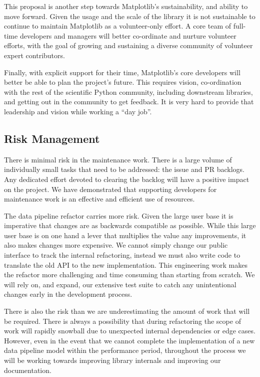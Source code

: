 \documentclass[12pt]{article}
\numberwithin{page}{section}
\begin{document}
This proposal is another step towards Matplotlib's sustainability, and
ability to move forward. Given the usage and the scale of the library
it is not sustainable to continue to maintain Matplotlib as a
volunteer-only effort.  A core team of full-time developers and
managers will better co-ordinate and nurture volunteer efforts, with
the goal of growing and sustaining a diverse community of volunteer
expert contributors.

Finally, with explicit support for their time, Matplotlib's core developers
will better be able to plan the project's future.
This requires vision, co-ordination with the rest of the scientific
Python community, including downstream libraries, and getting out in
the community to get feedback.  It is very hard to provide that
leadership and vision while working a ``day job''.


\subsection{Risk Management}

There is minimal risk in the maintenance work.  There is a large volume
of individually small tasks that need to be addressed: the issue and
PR backlogs.  Any dedicated effort devoted to clearing the backlog
will have a positive impact on the project.  We have demonstrated that
supporting developers for maintenance work is an effective and
efficient use of resources.


The data pipeline refactor carries more risk.  Given the large user
base it is imperative that changes are as backwards compatible as
possible.  While this large user base is on one hand a lever that
multiplies the value any improvements, it also makes changes more expensive.  We
cannot simply change our public interface to track the internal
refactoring, instead we must also write code to translate the
old API to the new implementation.  This engineering work makes the
refactor more challenging and time consuming than starting from
scratch.  We will rely on, and expand, our extensive test suite to
catch any unintentional changes early in the development process.

There is also the risk than we are underestimating the amount of work
that will be required.  There is always a possibility that during
refactoring the scope of work will rapidly snowball due to unexpected
internal dependencies or edge cases.
However, even in the event that we cannot complete the implementation of a new data
pipeline model within the performance period, throughout the process we will be working towards
improving library internals and improving our
documentation.
\end{document}
